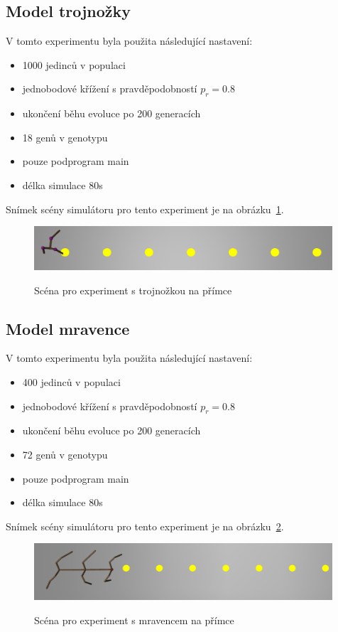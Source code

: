 \subsection{Model trojnožky}
V tomto experimentu byla použita následující nastavení:
\begin{itemize}
    \item 1000 jedinců v populaci
    \item jednobodové křížení s pravděpodobností $p_r = 0.8$
    \item ukončení běhu evoluce po 200 generacích
    \item 18 genů v genotypu
    \item pouze podprogram main
    \item délka simulace 80s
\end{itemize}

Snímek scény simulátoru pro tento experiment je na obrázku~\ref{fig:trojnozka_primka_zhora}.
\begin{figure}[h]
    \centering
    {\includegraphics[width=30em]{obrazky/trojnozka_primka_zhora.png}}
    \caption{
    Scéna pro experiment s trojnožkou na přímce
    }
    \label{fig:trojnozka_primka_zhora}
\end{figure}



\subsection{Model mravence}
V tomto experimentu byla použita následující nastavení:
\begin{itemize}
    \item 400 jedinců v populaci
    \item jednobodové křížení s pravděpodobností $p_r = 0.8$
    \item ukončení běhu evoluce po 200 generacích
    \item 72 genů v genotypu
    \item pouze podprogram main
    \item délka simulace 80s
\end{itemize}

Snímek scény simulátoru pro tento experiment je na obrázku~\ref{fig:mravenec_primka_zhora}.
\begin{figure}[h]
    \centering
    {\includegraphics[width=30em]{obrazky/mravenec_primka_zhora.png}}
    \caption{
    Scéna pro experiment s mravencem na přímce
    }
    \label{fig:mravenec_primka_zhora}
\end{figure}



